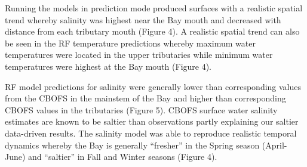 \documentclass{article}
\begin{document}

Running the models in prediction mode produced surfaces with a realistic spatial trend whereby salinity was highest near the Bay mouth and decreased with distance from each tributary mouth (Figure 4). A realistic spatial trend can also be seen in the RF temperature predictions whereby maximum water temperatures were located in the upper tributaries while minimum water temperatures were highest at the Bay mouth (Figure 4).


RF model predictions for salinity were generally lower than corresponding values from the CBOFS in the mainstem of the Bay and higher than corresponding CBOFS values in the tributaries (Figure 5). CBOFS surface water salinity estimates are known to be saltier than observations \cite{lanerolle2011second, vogelAssessingSatelliteSea2016} partly explaining our saltier data-driven results. The salinity model was able to reproduce realistic temporal dynamics whereby the Bay is generally “fresher” in the Spring season (April-June) and “saltier” in Fall and Winter seasons (Figure 4).

\end{document}
